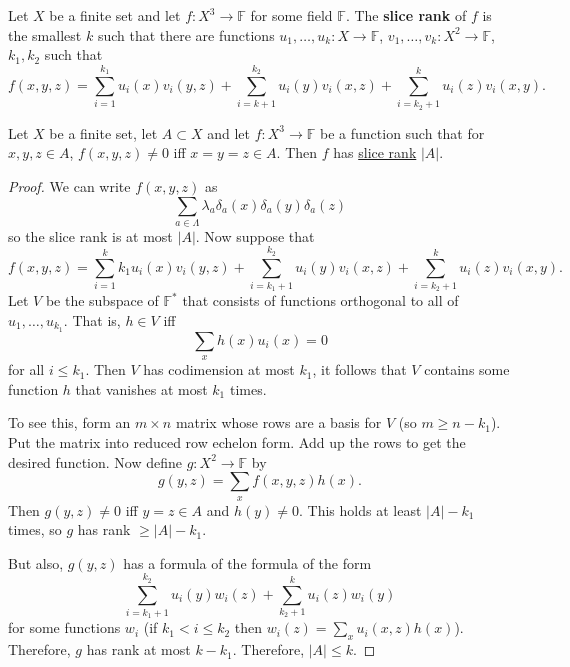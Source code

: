 \documentclass{article}
\newcommand{\1}[1]{\mathbbm{1}_{#1}}
\newcommand{\named}[1]{\textbf{#1}\index{#1}}
\begin{document}
\begin{defi}
Let $X$ be a finite set and let $f: X^3 \to \mathbb{F}$ for some field $\mathbb{F}$.
The \named{slice rank} of $f$ is the smallest $k$ such that there are functions $u_1, \dotsc, u_k: X \to \mathbb{F}$, $v_1, \dotsc, v_k: X^2 \to \mathbb{F}$, $k_1,k_2$ such that
\begin{equation*}
  f(x,y,z) = \sum_{i=1}^{k_1} u_i(x) v_i(y,z) + \sum_{i={k+1}}^{k_2} u_i(y) v_i(x,z) + \sum_{i=k_2+1}^k u_i(z) v_i(x,y).
\end{equation*}
\end{defi}
\begin{nlemma}\label{lem:4.1}
  Let $X$ be a finite set, let $A \subset X$ and let $f: X^3 \to \mathbb{F}$ be a function such that for $x,y,z \in A$, $f(x,y,z) \neq 0$ iff $x=y=z \in A$. Then $f$ has \hyperlink{def:slicerank}{slice rank} $|A|$.
\end{nlemma}
\begin{proof}
  We can write $f(x,y,z)$ as
  \begin{equation*}
    \sum_{a \in \Lambda} \lambda_a \delta_a(x) \delta_a(y) \delta_a(z)
  \end{equation*}
  so the slice rank is at most $|A|$.
  Now suppose that
  \begin{equation*}
    f(x,y,z) = \sum_{i=1}^k{k_1} u_i(x) v_i(y,z) + \sum_{i=k_1+1}^{k_2} u_i(y) v_i(x,z) + \sum_{i=k_2+1}^{k} u_i(z) v_i(x,y).
  \end{equation*}
  Let $V$ be the subspace of $\mathbb{F}^*$ that consists of functions orthogonal to all of $u_1, \dotsc, u_{k_1}$.
  That is, $h \in V$ iff
  \begin{equation*}
    \sum_x h(x) u_i(x) = 0
  \end{equation*}
  for all $i \leq k_1$.
  Then $V$ has codimension at most $k_1$, it follows that $V$ contains some function $h$ that vanishes at most $k_1$ times.

  To see this, form an $m \times n$ matrix whose rows are a basis for $V$ (so $m \geq n-k_1$). Put the matrix into reduced row echelon form.
  Add up the rows to get the desired function.
  Now define $g: X^2 \to \mathbb{F}$ by
  \begin{equation*}
    g(y,z) = \sum_x f(x,y,z) h(x).
  \end{equation*}
  Then $g(y,z) \neq 0$ iff $y=z \in A$ and $h(y) \neq 0$.
  This holds at least $|A|-k_1$ times,  so $g$ has rank $\geq |A| - k_1$.

  But also, $g(y,z)$ has a formula of the formula of the form
  \begin{equation*}
    \sum_{i=k_1+1}^{k_2} u_i(y) w_i(z) + \sum_{k_2+1}^k u_i(z) w_i(y)
  \end{equation*}
  for some functions $w_i$ (if $k_1 < i \leq k_2$ then $w_i(z) = \sum_x u_i(x,z) h(x)$).
  Therefore, $g$ has rank at most $k-k_1$.
  Therefore, $|A| \leq k$.
\end{proof}
\end{document}
